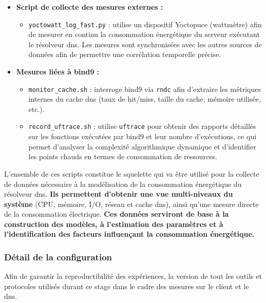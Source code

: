 \documentclass[12pt, a4paper]{report}
\begin{document}
\begin{itemize}
		\item \textbf{Script de collecte des mesures externes :}
		\begin{itemize}
			\item \texttt{yoctowatt\_log\_fast.py} : utilise un dispositif Yoctopuce (wattmètre) afin de mesurer en continu la consommation énergétique du serveur exécutant le résolveur \gls{dns}. Les mesures sont synchronisées avec les autres sources de données afin de permettre une corrélation temporelle précise.
		\end{itemize}

		\item \textbf{Mesures liées à \gls{bind9} :}
		\begin{itemize}
			\item \texttt{monitor\_cache.sh} : interroge \gls{bind9} via \texttt{rndc} afin d'extraire les métriques internes du cache \gls{dns} (taux de hit/miss, taille du cache, mémoire utilisée, etc.).
			\item \texttt{record\_uftrace.sh} : utilise \texttt{uftrace} pour obtenir des rapports détaillés sur les fonctions exécutées par \gls{bind9} et leur nombre d'exécutions, ce qui permet d'analyser la complexité algorithmique dynamique et d'identifier les points chauds en termes de consommation de ressources.
		\end{itemize}
		
	\end{itemize}
	
	L'ensemble de ces scripts constitue le squelette qui va être utilisé pour la collecte de données nécessaire à la modélisation de la consommation énergétique du résolveur \gls{dns}. \textbf{Ils permettent d'obtenir une vue multi-niveaux du système} (CPU, mémoire, I/O, réseau et cache \gls{dns}), ainsi qu'une mesure directe de la consommation électrique. \textbf{Ces données serviront de base à la construction des modèles, à l'estimation des paramètres et à l'identification des facteurs influençant la consommation énergétique.}
	
	\subsubsection{Détail de la configuration}

	Afin de garantir la reproductibilité des expériences, la version de tout les outils et protocoles utilisés durant ce stage dans le cadre des mesures sur le client et le \gls{dns}. 
\end{document}
